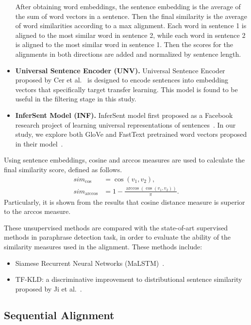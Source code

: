 \documentclass[runningheads]{llncs}
\begin{document}
\begin{spacing}{1.1}
\begin{itemize}
	After obtaining word embeddings, the sentence embedding is the average of the sum of word vectors in a sentence. Then the final similarity is the average of word similarities according to a max alignment. Each word in sentence 1 is aligned to the most similar word in sentence 2, while each word in sentence 2 is aligned to the most similar word in sentence 1. Then the scores for the alignments in both directions are added and normalized by sentence length.
	\item \textbf{Universal Sentence Encoder (UNV).} Universal Sentence Encoder proposed by Cer et al.~\cite{cer2018universal} is designed to encode sentences into embedding vectors that specifically target transfer learning. This model is found to be useful in the filtering stage in this study.
	\item \textbf{InferSent Model (INF).} InferSent model first proposed as a Facebook research project of learning universal representations of sentences~\cite{conneau2017supervised}. In our study, we explore both GloVe and FastText pretrained word vectors proposed in their model~\cite{pennington2014glove, joulin2017bag}.
\end{itemize}

Using sentence embeddings, cosine and arccos measures are used to calculate the final similarity score, defined as follows.
\begin{align*}
sim_{\cos} & = \cos(v_1, v_2), \\
sim_{\arccos} & = 1 - \frac{\arccos(\cos(v_1, v_2))}{\pi}.
\end{align*}
Particularly, it is shown from the results that cosine distance measure is superior to the arccos measure.

These unsupervised methods are compared with the state-of-art supervised methods in paraphrase detection task, in order to evaluate the ability of the similarity measures used in the alignment. These methods include:
\begin{itemize}
	\item Siamese Recurrent Neural Networks (MaLSTM)~\cite{mueller2016siamese}.
	\item TF-KLD: a discriminative improvement to distributional sentence similarity proposed by Ji et al.~\cite{ji2013discriminative}.
\end{itemize}

\subsection{Sequential Alignment}


\end{spacing}
\end{document}

